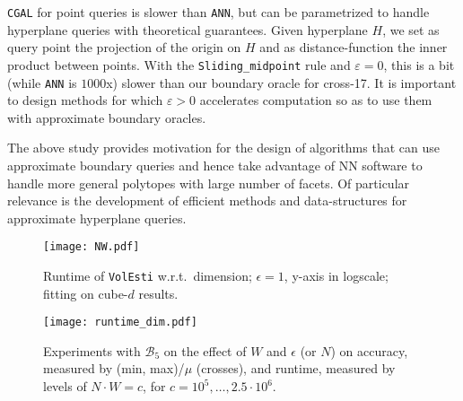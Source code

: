 \documentclass[11pt,a4paper]{article}
\def\B{{\mathcal B}} \def\E{{\mathcal E}}
\begin{document}
{\tt CGAL} for point queries is slower than {\tt ANN}, but can be
parametrized to handle hyperplane queries with theoretical guarantees.
Given hyperplane $H$, we set as query point the projection of the origin
on $H$ and as distance-function the inner product between points. 
With the {\tt Sliding\_midpoint} rule and $\varepsilon=0$, this is a bit
(while {\tt ANN} is $1000$x) slower than our boundary oracle for cross-17.
It is important to design methods for which
$\varepsilon>0$ accelerates computation so as to use them with
approximate boundary oracles. 

The above study provides motivation for the design of algorithms that can use approximate boundary queries and hence take advantage of NN software to handle more general polytopes with large number of facets. 
Of particular relevance is the development of efficient methods and
data-structures for approximate hyperplane queries.



\begin{figure*}[t]
	\centering
	\texttt{[image: NW.pdf]}
	\caption{Runtime of {\tt VolEsti}
w.r.t.\ dimension; $\epsilon=1$, y-axis in logscale; 
fitting on cube-$d$ results.}\label{fig:wN}
\end{figure*}

\begin{figure}[t]
	\centering
	\texttt{[image: runtime\_dim.pdf]}
	\caption{Experiments with $\B_5$ on the effect of $W$ and $\epsilon$ (or $N$) on
accuracy, measured by (min, max)/$\mu$ (crosses), and runtime,
measured by levels of $N\cdot W=c$, for $c=10^5,\dots, 2.5\cdot 10^6$.}\label{fig:runtime_dim}	
\end{figure}
\end{document}

